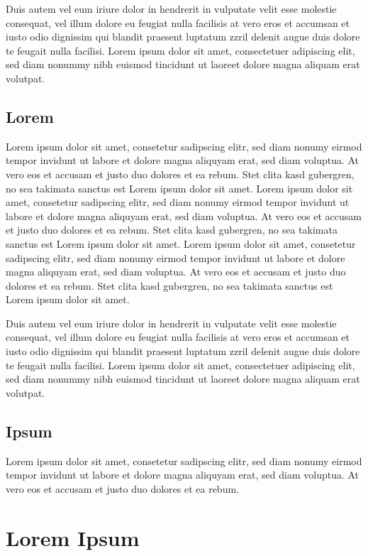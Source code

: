 \documentclass[12pt]{scrartcl}
\begin{document}
Duis autem vel eum iriure dolor in hendrerit in vulputate velit esse molestie
consequat, vel illum dolore eu feugiat nulla facilisis at vero eros et accumsan
et iusto odio dignissim qui blandit praesent luptatum zzril delenit augue duis
dolore te feugait nulla facilisi. Lorem ipsum dolor sit amet, consectetuer
adipiscing elit, sed diam nonummy nibh euismod tincidunt ut laoreet dolore
magna aliquam erat volutpat.

\subsection{Lorem}

Lorem ipsum dolor sit amet, consetetur sadipscing elitr, sed diam nonumy eirmod
tempor invidunt ut labore et dolore magna aliquyam erat, sed diam voluptua. At
vero eos et accusam et justo duo dolores et ea rebum. Stet clita kasd
gubergren, no sea takimata sanctus est Lorem ipsum dolor sit amet. Lorem ipsum
dolor sit amet, consetetur sadipscing elitr, sed diam nonumy eirmod tempor
invidunt ut labore et dolore magna aliquyam erat, sed diam voluptua. At vero
eos et accusam et justo duo dolores et ea rebum. Stet clita kasd gubergren, no
sea takimata sanctus est Lorem ipsum dolor sit amet. Lorem ipsum dolor sit
amet, consetetur sadipscing elitr, sed diam nonumy eirmod tempor invidunt ut
labore et dolore magna aliquyam erat, sed diam voluptua. At vero eos et accusam
et justo duo dolores et ea rebum. Stet clita kasd gubergren, no sea takimata
sanctus est Lorem ipsum dolor sit amet.

Duis autem vel eum iriure dolor in hendrerit in vulputate velit esse molestie
consequat, vel illum dolore eu feugiat nulla facilisis at vero eros et accumsan
et iusto odio dignissim qui blandit praesent luptatum zzril delenit augue duis
dolore te feugait nulla facilisi. Lorem ipsum dolor sit amet, consectetuer
adipiscing elit, sed diam nonummy nibh euismod tincidunt ut laoreet dolore
magna aliquam erat volutpat.

\subsection{Ipsum}

Lorem ipsum dolor sit amet, consetetur sadipscing elitr, sed diam nonumy eirmod
tempor invidunt ut labore et dolore magna aliquyam erat, sed diam voluptua. At
vero eos et accusam et justo duo dolores et ea rebum.

\newpage

\section{Lorem Ipsum}
\end{document}
